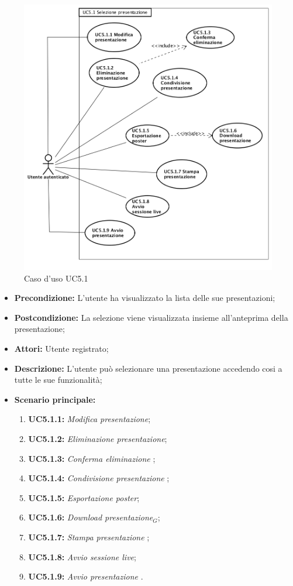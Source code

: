 \begin{figure}[h]
	\begin{center}
	\includegraphics[scale=0.5]{diagram/UC5-1.png}
	\caption{Caso d'uso UC5.1}
	\end{center}
\end{figure}
\begin{itemize}
	\item \textbf{Precondizione:} L'utente ha visualizzato la lista delle sue presentazioni;
	\item \textbf{Postcondizione:} La selezione viene visualizzata insieme all'anteprima della presentazione;
	\item \textbf{Attori:} Utente registrato;
	\item \textbf{Descrizione:} L'utente può selezionare una presentazione accedendo cosi a tutte le sue funzionalità;
	\item \textbf{Scenario principale:}
	\begin{enumerate}
		\item \textbf{ UC5.1.1:} \textit{ Modifica presentazione};
		\item \textbf{ UC5.1.2:} \textit{ Eliminazione presentazione};
		\item \textbf{ UC5.1.3:} \textit{ Conferma eliminazione };
		\item \textbf{ UC5.1.4:} \textit{ Condivisione presentazione };
		\item \textbf{ UC5.1.5:} \textit{ Esportazione poster};
		\item \textbf{ UC5.1.6:} \textit{ Download presentazione$_G$};
		\item \textbf{ UC5.1.7:} \textit{ Stampa presentazione };
		\item \textbf{ UC5.1.8:} \textit{ Avvio sessione live};
		\item \textbf{ UC5.1.9:} \textit{ Avvio presentazione }.
	\end{enumerate}
\end{itemize}
